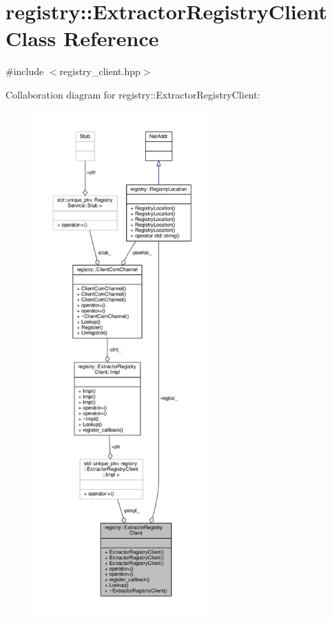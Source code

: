 \hypertarget{classregistry_1_1ExtractorRegistryClient}{}\section{registry\+:\+:Extractor\+Registry\+Client Class Reference}
\label{classregistry_1_1ExtractorRegistryClient}


{\ttfamily \#include $<$registry\+\_\+client.\+hpp$>$}



Collaboration diagram for registry\+:\+:Extractor\+Registry\+Client\+:\nopagebreak
\begin{figure}[H]
\begin{center}
\leavevmode
\includegraphics[height=550pt]{classregistry_1_1ExtractorRegistryClient__coll__graph}
\end{center}
\end{figure}
